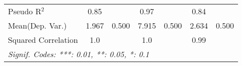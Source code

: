 \begin{tabular}{lcccccc}
   Pseudo R$^2$                                               & 0.85          &      & 0.97         &      & 0.84          & \\  
Mean(Dep. Var.) & 1.967 & 0.500 & 7.915 & 0.500 & 2.634 & 0.500 \\
   Squared Correlation                                        & 1.0           &      & 1.0          &      & 0.99          & \\  
   \midrule \midrule
   \multicolumn{7}{l}{\emph{Signif. Codes: ***: 0.01, **: 0.05, *: 0.1}}\\
\end{tabular}
\par\endgroup
